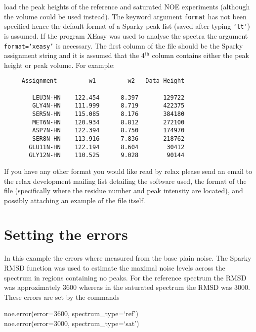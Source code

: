 load the peak heights of the reference and saturated NOE experiments (although the volume could be used instead).  The keyword argument \texttt{format} has not been specified hence the default format of a Sparky peak list (saved after typing \texttt{`lt'}) is assumed.  If the program XEasy was used to analyse the spectra the argument \texttt{format=`xeasy'} is necessary.  The first column of the file should be the Sparky assignment string and it is assumed that the 4$^\textrm{th}$ column contains either the peak height or peak volume.  For example:

{\footnotesize \begin{verbatim}
     Assignment         w1         w2   Data Height

        LEU3N-HN    122.454      8.397       129722
        GLY4N-HN    111.999      8.719       422375
        SER5N-HN    115.085      8.176       384180
        MET6N-HN    120.934      8.812       272100
        ASP7N-HN    122.394      8.750       174970
        SER8N-HN    113.916      7.836       218762
       GLU11N-HN    122.194      8.604        30412
       GLY12N-HN    110.525      9.028        90144
\end{verbatim}}

If you have any other format you would like read by relax please send an email to the relax development mailing list detailing the software used, the format of the file (specifically where the residue number and peak intensity are located), and possibly attaching an example of the file itself.




\section{Setting the errors}

In this example the errors where measured from the base plain noise.  The Sparky RMSD function was used to estimate the maximal noise levels across the spectrum in regions containing no peaks.  For the reference spectrum the RMSD was approximately 3600 whereas in the saturated spectrum the RMSD was 3000.  These errors are set by the commands

\begin{exampleenv}
noe.error(error=3600, spectrum\_type=`ref') \\
noe.error(error=3000, spectrum\_type=`sat')
\end{exampleenv}

